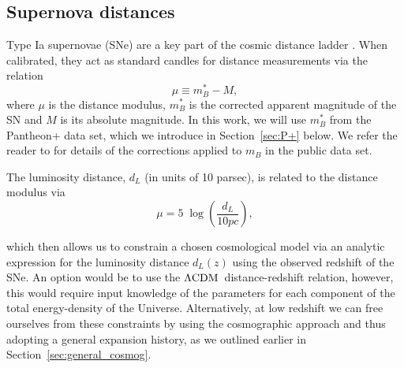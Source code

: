 \documentclass[fleqn,usenatbib]{mnras}
\newcommand{\lcdm}{$\Lambda\rm{CDM}$} %
\begin{document}
{\subsection{Supernova distances}
\label{sec: Sne}

Type Ia supernovae (SNe) are a key part of the cosmic distance ladder {\citep[see, e.g.][for a review]{Goobar2011}}. 
When calibrated, they act as standard candles for {distance} measurements %
{via} the relation %
\begin{equation}
    \label{eq: Tripp formula}
    \mu \equiv m_B^* - M ,
    \end{equation}
where $\mu$ is the distance modulus, $m_B^*$ is the corrected apparent magnitude {of the SN} and $M$ is {its} absolute magnitude. In this work, we will use 
$m_B^*$ from the Pantheon+ data set, {which we introduce in Section~\ref{sec:P+} below.}
{We refer the reader to} \citet{scolnic2021pantheon+} for details of the corrections applied {to $m_B$ in the public data set}. %


The luminosity distance, $d_L$ {(in units of 10 parsec)}, is related to the distance modulus {via} %
\begin{equation}
    \mu = 5 \;\log \left(\frac{d_L}{10pc}\right),
\end{equation}

{which then allows us to constrain a chosen}
cosmological model {via an analytic expression for the luminosity distance {$d_L(z)$ using}
the {observed} redshift of the SNe}. 
{An option would be to use} the \lcdm\, distance-{redshift}
relation{, however, this} {would} require input knowledge of the 
parameters for each component of the total energy-density {of the Universe}. 
Alternatively, at low redshift we can free ourselves from these constraints by using the cosmographic approach and {thus adopting} a general expansion history, as we {outlined earlier} in  Section~\ref{sec:general_cosmog}.


}
\end{document}
